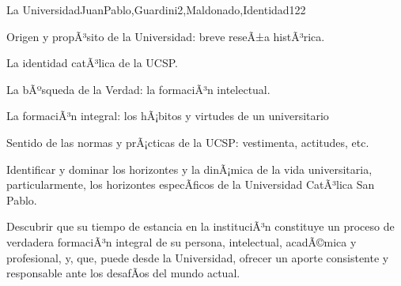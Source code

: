 \begin{syllabus}
\begin{unit}{La Universidad}{JuanPablo,Guardini2,Maldonado,Identidad}{12}{2}
\begin{topics}
	\item Origen y propÃ³sito de la Universidad: breve reseÃ±a histÃ³rica.
	\item La identidad catÃ³lica de la UCSP.
	\item La bÃºsqueda de la Verdad: la formaciÃ³n intelectual.
	\item La formaciÃ³n integral: los hÃ¡bitos y virtudes de un universitario
	\item Sentido de las normas y prÃ¡cticas de la UCSP: vestimenta, actitudes, etc.
\end{topics}
\begin{unitgoals}
	\item Identificar y dominar los horizontes y la dinÃ¡mica de la vida universitaria, particularmente,  los horizontes especÃ­ficos de la Universidad CatÃ³lica San Pablo.
	\item Descubrir que su tiempo de estancia en la instituciÃ³n constituye un proceso de verdadera formaciÃ³n integral de su persona, intelectual, acadÃ©mica y profesional, y, que, puede desde la Universidad, ofrecer un aporte consistente y responsable ante los desafÃ­os del mundo actual.   
\end{unitgoals}
\end{unit}



\begin{coursebibliography}
\end{coursebibliography}

\end{syllabus}
